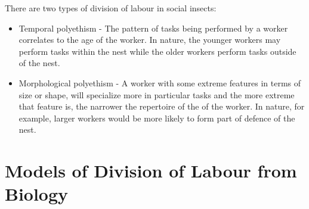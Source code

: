 There are two types of division of labour in social insects: 
\begin{itemize}
	\item Temporal polyethism - The pattern of tasks being performed by a worker correlates to the age of the worker. In nature, the younger workers may perform tasks within the nest while the older workers perform tasks outside of the nest.
	\item Morphological polyethism - A worker with some extreme features in terms of size or shape, will specialize more in particular tasks and the more extreme that feature is, the narrower the repertoire of the of the worker. In nature, for example, larger workers would be more likely to form part of defence of the nest. \cite{beshers2001models}
\end{itemize}




\section{Models of Division of Labour from Biology}


